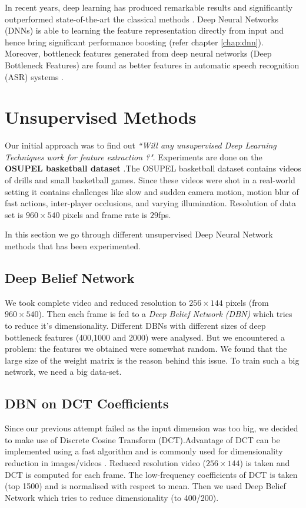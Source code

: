 In recent years, deep learning has produced remarkable results and significantly outperformed state-of-the-art the classical methods \cite{KarpathyCVPR14}. Deep Neural Networks (DNNs) is able to learning the feature representation directly from input and hence bring significant performance boosting (refer chapter \ref{chap:dnn}). Moreover, bottleneck features generated from deep neural networks (Deep Bottleneck Features) are found as better features in automatic speech recognition (ASR) systems \cite{yu2011improved,gehring2013extracting}.

\section{Unsupervised Methods}
\label{sec:event:unsupervised}
Our initial approach was to find out \textit{``Will any unsupervised Deep Learning Techniques work for feature extraction ?"}. Experiments are done on the \textbf{OSUPEL basketball dataset} \cite{brendel2011probabilistic}.The OSUPEL basketball dataset contains videos of drills and small basketball games. Since these videos were shot in a real-world setting it contains challenges like slow and sudden camera motion, motion blur of fast actions, inter-player occlusions, and varying illumination. Resolution of data set is $960 \times 540$ pixels and frame rate is $29$fps.

In this section we go through different unsupervised Deep Neural Network methods that has been experimented. 

\subsection{Deep Belief Network} 
We took complete video and reduced resolution to $256 \times 144$ pixels (from $960 \times 540$). Then each frame is fed to a \textit{Deep Belief Network (DBN)} which tries to reduce it's dimensionality. Different DBNs with different sizes of deep bottleneck features (400,1000 and 2000) were analysed. But we encountered a problem: the features we obtained were somewhat random. We found that the large size of the weight matrix is the reason behind this issue. To train such a big network, we need a big data-set.

\subsection{DBN on DCT Coefficients}
Since our previous attempt failed as the input dimension was too big, we decided to make use of Discrete Cosine Transform (DCT).Advantage of DCT can be implemented using a fast algorithm and is commonly used for dimensionality reduction in images/videos \cite{er2005high}. Reduced resolution video ($256 \times 144$) is taken and DCT is computed for each frame. The low-frequency coefficients of DCT is taken (top 1500) and is normalised with respect to mean. Then we used Deep Belief Network which tries to reduce dimensionality (to 400/200).

